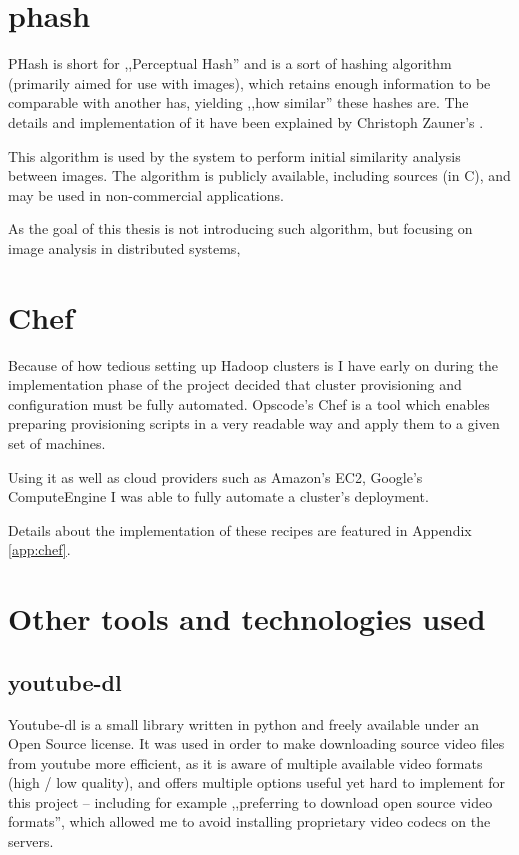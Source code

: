 \section{phash}
\label{sec:phash}
PHash is short for ,,Perceptual Hash'' and is a sort of hashing algorithm (primarily aimed for use with images), which retains enough information to be 
comparable with another has, yielding ,,how similar'' these hashes are. The details and implementation of it have been explained by Christoph Zauner's \cite{phash}.

This algorithm is used by the system to perform initial similarity analysis between images. 
The algorithm is publicly available, including sources (in C), and may be used in non-commercial applications.

As the goal of this thesis is not introducing such algorithm, but focusing on image analysis in distributed systems,

\section{Chef}
\label{sec:chef}
Because of how tedious setting up Hadoop clusters is I have early on during the implementation phase of the project decided that cluster 
provisioning and configuration must be fully automated. Opscode's Chef is a tool which enables preparing provisioning scripts in a very readable
way and apply them to a given set of machines.

Using it as well as cloud providers such as Amazon's EC2, Google's ComputeEngine I was able to fully automate a cluster's deployment.

Details about the implementation of these recipes are featured in Appendix \ref{app:chef}.


\section{Other tools and technologies used}
\label{sec:other tools}

\subsection{youtube-dl}
Youtube-dl is a small library written in python and freely available under an Open Source license. 
It was used in order to make downloading source video files from youtube more efficient, as it is aware of multiple available video formats (high / low quality), and offers multiple options useful yet hard to implement for this project -- including for example ,,preferring to download open source video formats'', which allowed me to avoid installing proprietary video codecs on the servers.

